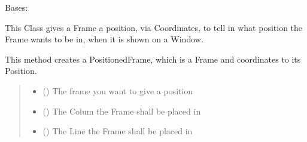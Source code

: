 \documentclass[letterpaper,10pt,english]{sphinxmanual}
\begin{document}
\begin{fulllineitems}
\label{\detokenize{apidoc/src.osm_configurator.view.states:src.osm_configurator.view.states.positioned_frame.PositionedFrame}}
\pysigstartsignatures
{}
\pysigstopsignatures
\sphinxAtStartPar
Bases: 

\sphinxAtStartPar
This Class gives a Frame a position, via Coordinates, to tell in what position the Frame wants to be in, when
it is shown on a Window.

\begin{fulllineitems}
\label{\detokenize{apidoc/src.osm_configurator.view.states:src.osm_configurator.view.states.positioned_frame.PositionedFrame.__init__}}
\pysigstartsignatures
{}
\pysigstopsignatures
\sphinxAtStartPar
This method creates a PositionedFrame, which is a Frame and coordinates to its Position.
\begin{quote}\begin{description}
\begin{itemize}
\item {} 
\sphinxAtStartPar
{} ({\hyperref[\detokenize{apidoc/src.osm_configurator.view.toplevelframes:src.osm_configurator.view.toplevelframes.top_level_frame.TopLevelFrame}]{}}) \textendash{} The frame you want to give a position

\item {} 
\sphinxAtStartPar
{} () \textendash{} The Colum the Frame shall be placed in

\item {} 
\sphinxAtStartPar
{} () \textendash{} The Line the Frame shall be placed in


\end{itemize}
\end{description}
\end{quote}
\end{fulllineitems}
\end{fulllineitems}
\end{document}
